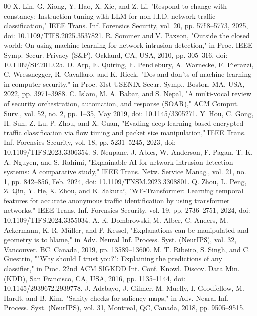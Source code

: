 \documentclass[conference]{IEEEtran}
\begin{document}
\begin{thebibliography}{00}
 X. Lin, G. Xiong, Y. Hao, X. Xie, and Z. Li, "Respond to change with constancy: Instruction-tuning with LLM for non-I.I.D. network traffic classification," IEEE Trans. Inf. Forensics Security, vol. 20, pp. 5758–5773, 2025, doi: 10.1109/TIFS.2025.3537821.
 R. Sommer and V. Paxson, "Outside the closed world: On using machine learning for network intrusion detection," in Proc. IEEE Symp. Secur. Privacy (S\&P), Oakland, CA, USA, 2010, pp. 305–316, doi: 10.1109/SP.2010.25.
 D. Arp, E. Quiring, F. Pendlebury, A. Warnecke, F. Pierazzi, C. Wressnegger, R. Cavallaro, and K. Rieck, "Dos and don'ts of machine learning in computer security," in Proc. 31st USENIX Secur. Symp., Boston, MA, USA, 2022, pp. 3971–3988.
 C. Islam, M. A. Babar, and S. Nepal, "A multi-vocal review of security orchestration, automation, and response (SOAR)," ACM Comput. Surv., vol. 52, no. 2, pp. 1–35, May 2019, doi: 10.1145/3305271.
 Y. Hou, C. Gong, H. Sun, Z. Lu, P. Zhou, and X. Guan, "Evading deep learning-based encrypted traffic classification via flow timing and packet size manipulation," IEEE Trans. Inf. Forensics Security, vol. 18, pp. 5231–5245, 2023, doi: 10.1109/TIFS.2023.3306354.
 S. Neupane, J. Ables, W. Anderson, F. Pagan, T. K. A. Nguyen, and S. Rahimi, "Explainable AI for network intrusion detection systems: A comparative study," IEEE Trans. Netw. Service Manag., vol. 21, no. 1, pp. 842–856, Feb. 2024, doi: 10.1109/TNSM.2023.3308801.
 Q. Zhou, L. Peng, Z. Qin, Y. He, X. Zhou, and K. Sakurai, "WF-Transformer: Learning temporal features for accurate anonymous traffic identification by using transformer networks," IEEE Trans. Inf. Forensics Security, vol. 19, pp. 2736–2751, 2024, doi: 10.1109/TIFS.2024.3355034.
 A.-K. Dombrowski, M. Alber, C. Anders, M. Ackermann, K.-R. Müller, and P. Kessel, "Explanations can be manipulated and geometry is to blame," in Adv. Neural Inf. Process. Syst. (NeurIPS), vol. 32, Vancouver, BC, Canada, 2019, pp. 13589–13600.
 M. T. Ribeiro, S. Singh, and C. Guestrin, ""Why should I trust you?": Explaining the predictions of any classifier," in Proc. 22nd ACM SIGKDD Int. Conf. Knowl. Discov. Data Min. (KDD), San Francisco, CA, USA, 2016, pp. 1135–1144, doi: 10.1145/2939672.2939778.
 J. Adebayo, J. Gilmer, M. Muelly, I. Goodfellow, M. Hardt, and B. Kim, "Sanity checks for saliency maps," in Adv. Neural Inf. Process. Syst. (NeurIPS), vol. 31, Montreal, QC, Canada, 2018, pp. 9505–9515.
\end{thebibliography}
\end{document}
